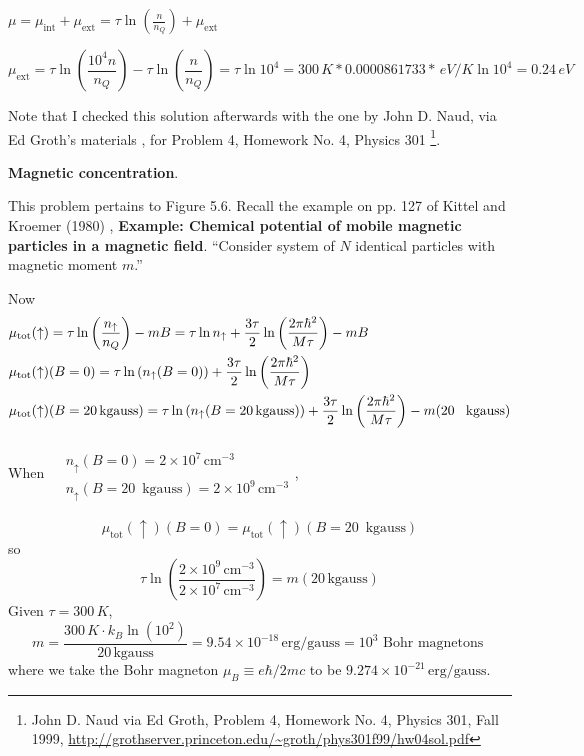  $\mu = \mu_{\text{int}} + \mu_{\text{ext}} = \tau \ln{ \left( \frac{n}{n_Q} \right) } + \mu_{\text{ext}}$

\[
\mu_{\text{ext}} = \tau \ln{ \left( \frac{10^4 n }{n_Q} \right) } - \tau \ln{ \left( \frac{n}{n_Q} \right) } = \tau \ln{ 10^4} = 300 \, K * 0.0000861733 * \, eV/K \ln{ 10^4} = 0.24 \, eV
\]

Note that I checked this solution afterwards with the one by John D. Naud, via Ed Groth's materials \cite{EGroth1999}, for Problem 4, Homework No. 4, Physics 301 \footnote{John D. Naud via Ed Groth, Problem 4, Homework No. 4, Physics 301, Fall 1999, \url{http://grothserver.princeton.edu/~groth/phys301f99/hw04sol.pdf} }.  




 \textbf{Magnetic concentration}.  

This problem pertains to Figure 5.6.  Recall the example on pp. 127 of Kittel and Kroemer (1980) \cite{CKittelHKroemer1980}, \textbf{Example: Chemical potential of mobile magnetic particles in a magnetic field}.  ``Consider system of $N$ identical particles with magnetic moment $m$.''  

Now
\[
\begin{aligned}
  & \mu_{\text{tot}}(\uparrow) = \tau \ln{ \left( \frac{n_{\uparrow}}{n_Q} \right) } - mB = \tau \ln{n_{\uparrow}} + \frac{3\tau}{2} \ln{ \left( \frac{2\pi \hbar^2}{M\tau} \right) } - mB  \\
  & \mu_{\text{tot}}(\uparrow)(B=0) = \tau \ln{ \left( n_{\uparrow}(B=0) \right) } + \frac{3\tau}{2} \ln{\left( \frac{2\pi \hbar^2}{ M\tau }\right) }   \\
  & \mu_{\text{tot}}(\uparrow)(B=20 \, \text{kgauss}) = \tau \ln{ ( n_{\uparrow}(B=20\, \text{kgauss}))} + \frac{3\tau}{2} \ln{\left( \frac{2\pi \hbar^2}{M\tau} \right) } - m (20 \text{ \, kgauss} )
\end{aligned}
\]

When $\begin{aligned} & \quad \\
  & n_{\uparrow}(B=0) = 2\times 10^7 \, \text{cm}^{-3} \\
  & n_{\uparrow}(B=20 \, \text{ kgauss} )  = 2\times 10^9 \, \text{cm}^{-3} \end{aligned}$, 

\[
\mu_{\text{tot}}(\uparrow)(B=0) = \mu_{\text{tot}}(\uparrow)(B=20\, \text{ kgauss} ) 
\]
so
\[
\tau \ln{ \left( \frac{ 2\times 10^9 \, \text{cm}^{-3} }{ 2\times 10^7 \, \text{cm}^{-3} } \right)} = m(20 \, \text{kgauss} )
\]
Given $\tau =300 \, K$, 
\[
m = \frac{300 \, K  \cdot k_B \ln{ (10^2) } }{ 20 \, \text{kgauss} } = 9.54 \times 10^{-18} \, \text{erg}/\text{gauss} = 10^3 \text{ Bohr magnetons }
\]
where we take the Bohr magneton $\mu_B \equiv e\hbar/2mc$ to be $9.274 \times 10^{-21} \, \text{erg}/\text{gauss}$.  

